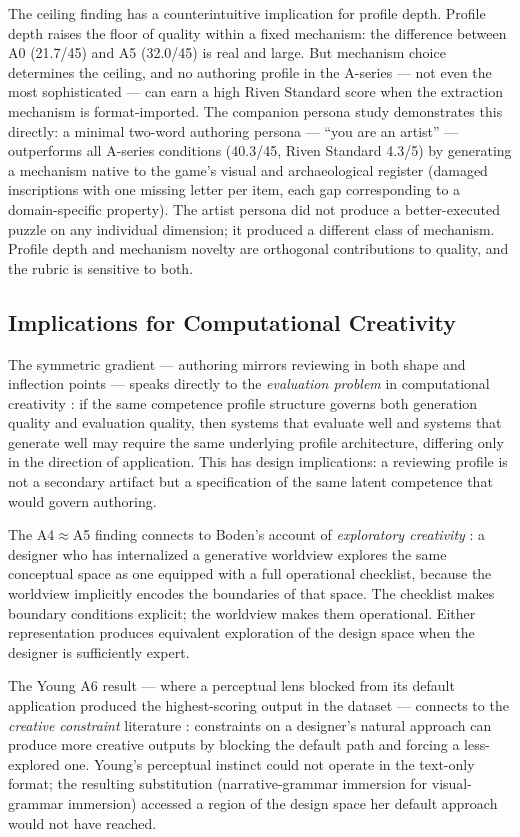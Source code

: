 The ceiling finding has a counterintuitive implication for profile depth. Profile depth raises the floor of quality within a fixed mechanism: the difference between A0 (21.7/45) and A5 (32.0/45) is real and large. But mechanism choice determines the ceiling, and no authoring profile in the A-series — not even the most sophisticated — can earn a high Riven Standard score when the extraction mechanism is format-imported. The companion persona study demonstrates this directly: a minimal two-word authoring persona — ``you are an artist'' — outperforms all A-series conditions (40.3/45, Riven Standard 4.3/5) by generating a mechanism native to the game's visual and archaeological register (damaged inscriptions with one missing letter per item, each gap corresponding to a domain-specific property). The artist persona did not produce a better-executed puzzle on any individual dimension; it produced a different class of mechanism. Profile depth and mechanism novelty are orthogonal contributions to quality, and the rubric is sensitive to both.

\subsection{Implications for Computational Creativity}

The symmetric gradient — authoring mirrors reviewing in both shape and inflection points — speaks directly to the \emph{evaluation problem} in computational creativity \cite{colton2012computational}: if the same competence profile structure governs both generation quality and evaluation quality, then systems that evaluate well and systems that generate well may require the same underlying profile architecture, differing only in the direction of application. This has design implications: a reviewing profile is not a secondary artifact but a specification of the same latent competence that would govern authoring.

The A4$\approx$A5 finding connects to Boden's account of \emph{exploratory creativity} \cite{boden2004creative}: a designer who has internalized a generative worldview explores the same conceptual space as one equipped with a full operational checklist, because the worldview implicitly encodes the boundaries of that space. The checklist makes boundary conditions explicit; the worldview makes them operational. Either representation produces equivalent exploration of the design space when the designer is sufficiently expert.

The Young A6 result — where a perceptual lens blocked from its default application produced the highest-scoring output in the dataset — connects to the \emph{creative constraint} literature \cite{stokes2006}: constraints on a designer's natural approach can produce more creative outputs by blocking the default path and forcing a less-explored one. Young's perceptual instinct could not operate in the text-only format; the resulting substitution (narrative-grammar immersion for visual-grammar immersion) accessed a region of the design space her default approach would not have reached.

